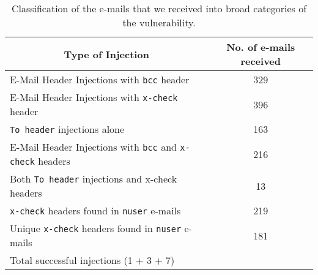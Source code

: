 \begin{table*}[!htbp]
	\centering
	\begin{tabular}{|l|c|}
		\hline
		\multicolumn{1}{|c|}{\textbf{Type of Injection}} &
		\multicolumn{1}{p{3cm}|}{\centering \textbf{No. of e-mails received}}\\
		\hline
		E-Mail Header Injections with \texttt{bcc} header & 329\\
		\hline
		E-Mail Header Injections with \texttt{x-check} header & 396\\
		\hline
		\texttt{To header} injections alone & 163\\
		\hline
		E-Mail Header Injections with \texttt{bcc} and \texttt{x-check} headers & 216\\
		\hline
		Both \texttt{To header} injections and x-check headers &
		13\\
		\hline
		\texttt{x-check} headers found in \texttt{nuser} e-mails & 219\\
		\hline
		Unique \texttt{x-check} headers found in \texttt{nuser} e-mails & 181\\
		\hline
		Total successful injections (1 + 3 + 7) & \success\ \\
		
		\hline
	\end{tabular}
	\caption[]{Classification of the e-mails that we received into broad categories of the vulnerability.}
	\label{tab:analysis}
\end{table*}